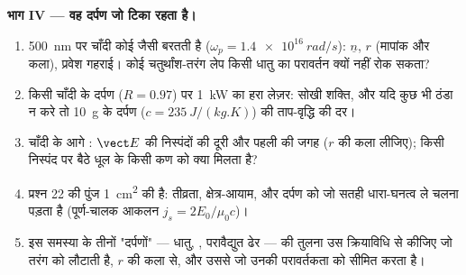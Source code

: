 \begin{problem}
\medskip
\noindent\textbf{भाग IV --- वह दर्पण जो टिका रहता है।}
\begin{enumerate}[resume]
  \item \qty{500}{nm} पर चाँदी कोई  जैसी बरतती है ($\omega_p = \qty{1.4e16}{rad/s}$):
        $\underline n$, $r$ (मापांक और कला), प्रवेश गहराई। कोई
        चतुर्थांश-तरंग लेप किसी धातु का परावर्तन क्यों नहीं रोक सकता?
  \item किसी चाँदी के दर्पण ($R = 0.97$) पर \qty{1}{kW} का हरा लेज़र: सोखी
        शक्ति, और यदि कुछ भी ठंडा न करे तो \qty{10}{g} के दर्पण
        ($c = \qty{235}{J/(kg.K)}$) की ताप-वृद्धि की दर।
  \item चाँदी के आगे : $\vect E$ की निस्पंदों की दूरी
        और पहली की जगह ($r$ की कला लीजिए); किसी निस्पंद पर बैठे
        धूल के किसी कण को क्या मिलता है?
  \item प्रश्न 22 की पुंज \qty{1}{cm^2} की है: तीव्रता, क्षेत्र-आयाम,
        और दर्पण को जो सतही धारा-घनत्व ले चलना पड़ता है
        (पूर्ण-चालक आकलन $j_s = 2E_0/\mu_0c$)।
  \item इस समस्या के तीनों "दर्पणों" --- धातु, , परावैद्युत
        ढेर --- की तुलना उस क्रियाविधि से कीजिए जो तरंग को लौटाती
        है, $r$ की कला से, और उससे जो उनकी परावर्तकता को सीमित
        करता है।
\end{enumerate}
\end{problem}
